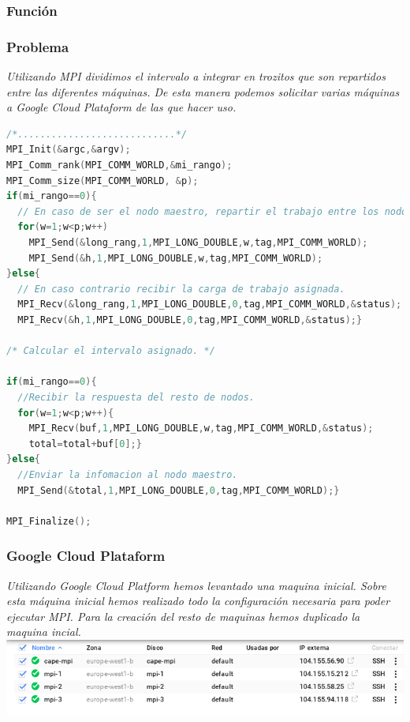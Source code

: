 \documentclass[10pt]{beamer}
\begin{document}
\begin{frame}
  \frametitle{Función}
  \begin{center}
  \end{center}
\end{frame}


\begin{frame}[fragile] 
  \frametitle{Problema}
  \emph{
    Utilizando MPI dividimos el intervalo a integrar en trozitos que son
    repartidos entre las diferentes máquinas. De esta manera podemos solicitar
    varias máquinas a Google Cloud Plataform de las que hacer uso.
  }
  \begin{lstlisting}[language=C,basicstyle=\tiny]
/*............................*/
MPI_Init(&argc,&argv);
MPI_Comm_rank(MPI_COMM_WORLD,&mi_rango);
MPI_Comm_size(MPI_COMM_WORLD, &p);
if(mi_rango==0){
  // En caso de ser el nodo maestro, repartir el trabajo entre los nodos.
  for(w=1;w<p;w++)
    MPI_Send(&long_rang,1,MPI_LONG_DOUBLE,w,tag,MPI_COMM_WORLD);
    MPI_Send(&h,1,MPI_LONG_DOUBLE,w,tag,MPI_COMM_WORLD);
}else{
  // En caso contrario recibir la carga de trabajo asignada.
  MPI_Recv(&long_rang,1,MPI_LONG_DOUBLE,0,tag,MPI_COMM_WORLD,&status);
  MPI_Recv(&h,1,MPI_LONG_DOUBLE,0,tag,MPI_COMM_WORLD,&status);}

/* Calcular el intervalo asignado. */

if(mi_rango==0){
  //Recibir la respuesta del resto de nodos.
  for(w=1;w<p;w++){
    MPI_Recv(buf,1,MPI_LONG_DOUBLE,w,tag,MPI_COMM_WORLD,&status);
    total=total+buf[0];}
}else{
  //Enviar la infomacion al nodo maestro.
  MPI_Send(&total,1,MPI_LONG_DOUBLE,0,tag,MPI_COMM_WORLD);}

MPI_Finalize();
  \end{lstlisting}
\end{frame}

\begin{frame}[fragile] 
  \frametitle{Google Cloud Plataform}
  \emph{
    Utilizando Google Cloud Platform hemos levantado una maquina inicial.
    Sobre esta máquina inicial hemos realizado todo la configuración necesaria
    para poder ejecutar MPI. Para la creación del resto de maquinas hemos
    duplicado la maquina incial.
    \vspace*{30px}
    \includegraphics[scale=0.4]{maquinas.png}
  }
\end{frame}
\end{document}
